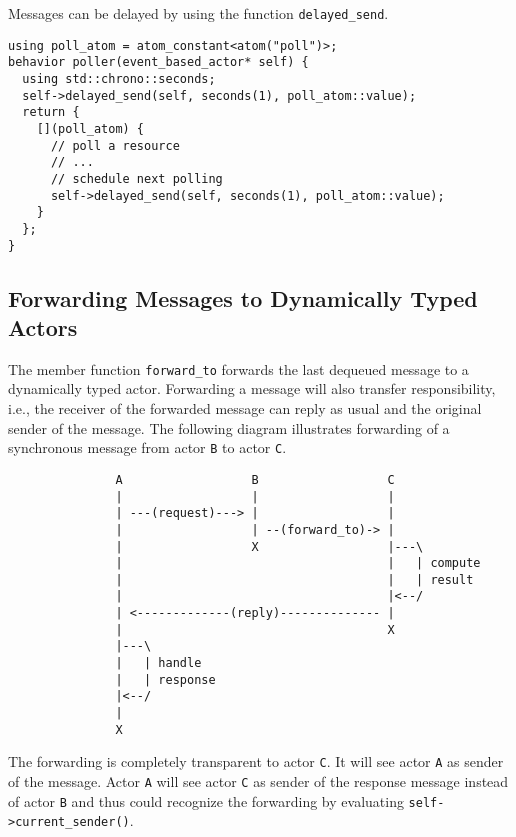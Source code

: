 Messages can be delayed by using the function \lstinline^delayed_send^.

\begin{lstlisting}
using poll_atom = atom_constant<atom("poll")>;
behavior poller(event_based_actor* self) {
  using std::chrono::seconds;
  self->delayed_send(self, seconds(1), poll_atom::value);
  return {
    [](poll_atom) {
      // poll a resource
      // ...
      // schedule next polling
      self->delayed_send(self, seconds(1), poll_atom::value);
    }
  };
}
\end{lstlisting}

\clearpage
\subsection{Forwarding Messages to Dynamically Typed Actors}
\label{forward}

The member function \lstinline^forward_to^ forwards the last dequeued message to a dynamically typed actor.
Forwarding a message will also transfer responsibility, i.e., the receiver of the forwarded message can reply as usual and the original sender of the message.
The following diagram illustrates forwarding of a synchronous message from actor \texttt{B} to actor \texttt{C}.

\begin{footnotesize}
\begin{verbatim}
               A                  B                  C
               |                  |                  |
               | ---(request)---> |                  |
               |                  | --(forward_to)-> |
               |                  X                  |---\
               |                                     |   | compute
               |                                     |   | result
               |                                     |<--/
               | <-------------(reply)-------------- |
               |                                     X
               |---\
               |   | handle
               |   | response
               |<--/
               |
               X
\end{verbatim}
\end{footnotesize}

The forwarding is completely transparent to actor \texttt{C}. It will see actor \texttt{A} as sender of the message.
Actor \texttt{A} will see actor \texttt{C} as sender of the response message instead of actor \texttt{B} and thus could recognize the forwarding by evaluating \lstinline^self->current_sender()^.

